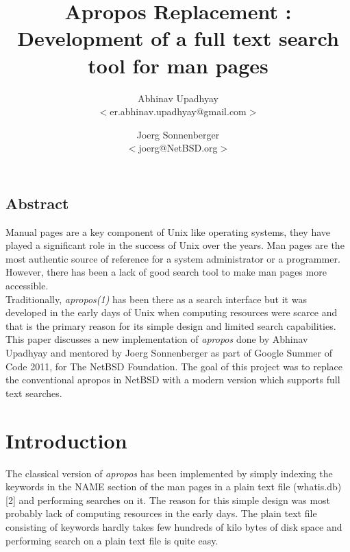\documentclass[letterpaper,twocolumn,10pt]{article}
\begin{document}
\date{}

\title{\Large \bf Apropos Replacement : Development of a full text search tool for man pages}

\author{
{\rm Abhinav Upadhyay}\\
$<$er.abhinav.upadhyay@gmail.com$>$
\and
{\rm Joerg Sonnenberger}\\
$<$joerg@NetBSD.org$>$
} %

\maketitle

\thispagestyle{empty}

\subsection*{Abstract}
Manual pages are a key component of Unix like operating systems, they have
played a significant role in the success of Unix over the years. Man pages are
the most authentic source of reference for a system administrator or a
programmer. However, there has been a lack of good search tool to make
man pages more accessible. \\

Traditionally, \textit{apropos(1)} has been there as a search interface but it
was developed in the early days of Unix when computing resources were scarce
and that is the primary reason for its simple design and limited search
capabilities. \\

This paper discusses a new implementation of \textit{apropos} done by
Abhinav Upadhyay and mentored by Joerg Sonnenberger as part of
Google Summer of Code 2011, for The NetBSD Foundation. The goal of this project
was to replace the
conventional apropos in NetBSD with a modern version which supports full text
searches. \\


\section{Introduction}
The classical version of \textit{apropos} has been implemented by simply
indexing the keywords in the NAME section of the man pages in a plain text file
(whatis.db) [2]
and performing searches on it. The reason for this simple design was most
probably lack of computing resources in the early days. The plain text file
consisting of keywords hardly takes few hundreds of kilo bytes of disk space
and performing search on a plain text file is quite easy. \\
\end{document}
